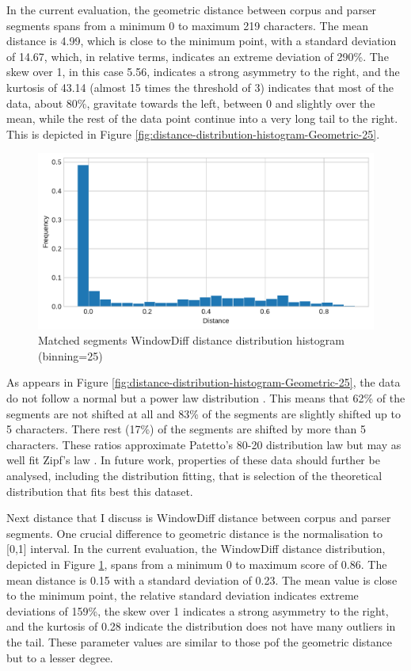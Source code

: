     In the current evaluation, the geometric distance between corpus and parser segments spans from a minimum 0 to maximum 219 characters. The mean distance is 4.99, which is close to the minimum point, with a standard deviation of 14.67, which, in relative terms, indicates an extreme deviation of 290\%. The skew over 1, in this case 5.56, indicates a strong asymmetry to the right, and the kurtosis of 43.14 (almost 15 times the threshold of 3) indicates that most of the data, about 80\%, gravitate towards the left, between 0 and slightly over the mean, while the rest of the data point continue into a very long tail to the right. This is depicted in Figure \ref{fig:distance-distribution-histogram-Geometric-25}. 
    
    \begin{figure}[!ht]
    \centering
    \includegraphics[width=.85\textwidth]{evaluation-results/figures/distance-distribution-histogram-WindowDiff-25.pdf}
    \caption{Matched segments WindowDiff distance distribution histogram (binning=25)}
    \label{fig:distance-distribution-histogram-WindowDiff-25}
    \end{figure}
    
    As appears in Figure \ref{fig:distance-distribution-histogram-Geometric-25}, the data do not follow a normal but a power law distribution \citep{newman2005power}. This means that 62\% of the segments are not shifted at all and 83\% of the segments are slightly shifted up to 5 characters. There rest (17\%) of the segments are shifted by more than 5 characters. These ratios approximate Patetto's 80-20 distribution law but may as well fit Zipf's law \citep{newman2005power}. In future work, properties of these data should further be analysed, including the distribution fitting, that is selection of the theoretical distribution that fits best this dataset.
    
    Next distance that I discuss is WindowDiff distance between corpus and parser segments. One crucial difference to geometric distance is the normalisation to [0,1] interval. In the current evaluation, the WindowDiff distance distribution, depicted in Figure \ref{fig:distance-distribution-histogram-WindowDiff-25}, spans from a minimum 0 to maximum score of 0.86. The mean distance is 0.15 with a standard deviation of 0.23. The mean value is close to the minimum point, the relative standard deviation indicates extreme deviations of 159\%, the skew over 1 indicates a strong asymmetry to the right, and the kurtosis of 0.28 indicate the distribution does not have many outliers in the tail. These parameter values are similar to those pof the geometric distance but to a lesser degree. 
    
